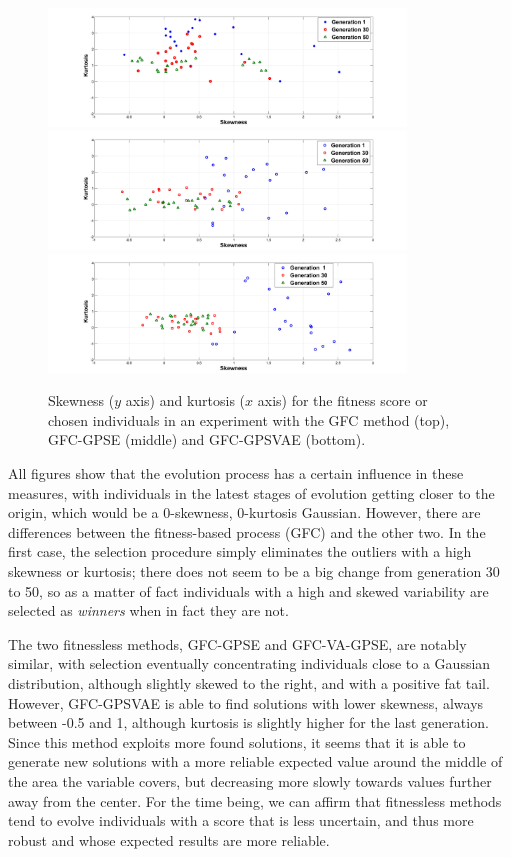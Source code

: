 \documentclass[10pt,journal,compsoc]{IEEEtran}
\begin{document}
\begin{figure}[!ht]	
	\begin{center}
          \includegraphics[width=9.5cm]{fig/GFC__.jpg}
          \includegraphics[width=9.5cm]{fig/GFCRSE__.jpg}
          \includegraphics[width=9.5cm]{fig/GFCVARSE__.jpg}
		\caption{Skewness ($y$ axis) and kurtosis ($x$ axis)
                  for the fitness score or chosen individuals in an experiment with the
                  {\sf GFC} method \cite{salem_cig2018} (top), {\sf GFC-GPSE} (middle) and {\sf GFC-GPSVAE} (bottom).}
		\label{fig:gfcsk} \label{fig:gfcrsesk} \label{fig:gfcvarsesk}			
	\end{center}	
\end{figure}

All figures show that the evolution process has a certain influence in
these measures, with individuals in the latest stages of evolution
getting closer to the origin, which would be a 0-skewness, 0-kurtosis
Gaussian. However, there are differences between the fitness-based
process ({\sf GFC}) and the other two. In the first case, the
selection procedure simply eliminates the outliers with a high
skewness or kurtosis; there does not seem to be a big change from
generation 30 to 50, so as a matter of fact individuals with a high
and skewed variability are selected as {\em winners} when in fact they
are not.

The two fitnessless methods, {\sf GFC-GPSE} and {\sf GFC-VA-GPSE}, are
notably similar, with selection eventually concentrating individuals
close to a Gaussian distribution, although slightly skewed to the
right, and with a positive fat tail. However, {\sf GFC-GPSVAE} is able
to find solutions with lower skewness, always between -0.5 and 1,
although kurtosis is slightly higher for the last generation. Since
this method exploits more found solutions, it seems that it is able to
generate new solutions with a more reliable expected value around the
middle of the area the variable covers, but decreasing more slowly
towards values further away from the center. For the time being,
we can affirm that fitnessless methods tend to evolve individuals
with a score that is less uncertain, and thus more robust and whose
expected results are more reliable.
\end{document}
